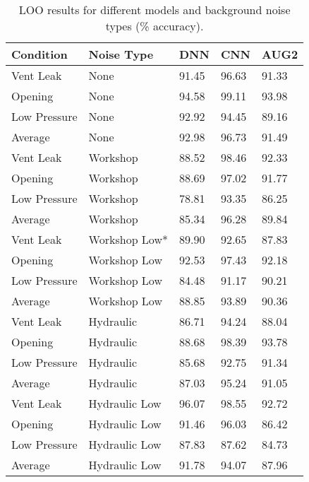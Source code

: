 \begin{table}[H]
    \centering
    \caption{LOO results for different models and background noise types (\% accuracy).}
    \begin{tabular}{l l l l l}
    \toprule
    Condition & Noise Type & DNN & CNN & AUG2 \\ \midrule
    Vent Leak & None & 91.45 & 96.63 &  91.33\\
    Opening & None & 94.58 & 99.11 &  93.98\\
    Low Pressure & None & 92.92 & 94.45 & 89.16\\ \midrule
    Average & None & 92.98 & 96.73 & 91.49 \\ \midrule
    
    Vent Leak & Workshop &  88.52 & 98.46 & 92.33\\
    Opening & Workshop & 88.69 & 97.02 & 91.77\\
    Low Pressure & Workshop & 78.81 & 93.35 & 86.25\\ \midrule
    Average & Workshop & 85.34 & 96.28 & 89.84 \\ \midrule
    
    Vent Leak & Workshop Low* &  89.90 & 92.65 & 87.83\\
    Opening & Workshop Low & 92.53 & 97.43 & 92.18\\
    Low Pressure & Workshop Low & 84.48 & 91.17 & 90.21\\ \midrule
    Average & Workshop Low & 88.85 & 93.89 & 90.36 \\ \midrule
    
    Vent Leak & Hydraulic  & 86.71 & 94.24 &  88.04\\
    Opening & Hydraulic & 88.68 & 98.39  & 93.78\\
    Low Pressure & Hydraulic & 85.68 & 92.75 &  91.34\\ \midrule
    Average & Hydraulic & 87.03 & 95.24 &  91.05\\ \midrule
    
    Vent Leak & Hydraulic Low  & 96.07 & 98.55 &  92.72\\
    Opening & Hydraulic Low & 91.46 & 96.03 & 86.42\\
    Low Pressure & Hydraulic Low & 87.83 & 87.62 & 84.73\\ \midrule
    Average & Hydraulic Low & 91.78 & 94.07 & 87.96 \\
    
    \bottomrule
    \end{tabular}
	\label{tab:noise-logo}
\end{table}



